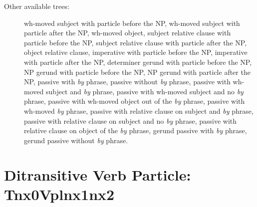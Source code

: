 \begin{description}
\item[Other available trees:] wh-moved subject with particle before the NP,
wh-moved subject with particle after the NP, wh-moved object, subject
relative clause with particle before the NP, subject relative clause with
particle after the NP, object relative clause, imperative with particle
before the NP, imperative with particle after the NP, determiner gerund
with particle before the NP, NP gerund with particle before the NP, NP
gerund with particle after the NP, passive with {\it by} phrase, passive
without {\it by} phrase, passive with wh-moved subject and {\it by} phrase,
passive with wh-moved subject and no {\it by} phrase, passive with wh-moved
object out of the {\it by} phrase, passive with wh-moved {\it by} phrase,
passive with relative clause on subject and {\it by} phrase, passive with
relative clause on subject and no {\it by} phrase, passive with relative
clause on object of the {\it by} phrase, gerund passive with {\it by}
phrase, gerund passive without {\it by} phrase.

\end{description}




\section{Ditransitive Verb Particle: Tnx0Vplnx1nx2}
\label{nx0Vplnx1nx2}

